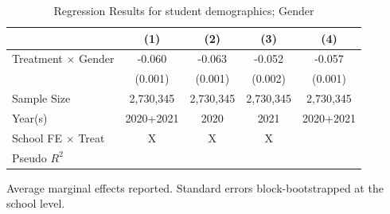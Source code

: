 \begin{table}[!h]
\centering
\caption{Regression Results for student demographics; Gender}
\centering
\begin{threeparttable}
\begin{tabular}[t]{lcccc}
\toprule
 & (1) & (2) & (3) & (4)\\
\midrule
Treatment $\times$ Gender & -0.060 & -0.063 & -0.052 & -0.057\\
 & (0.001) & (0.001) & (0.002) & (0.001)\\
\midrule
Sample Size & 2,730,345 & 2,730,345 & 2,730,345 & 2,730,345\\
Year(s) & 2020+2021 & 2020 & 2021 & 2020+2021\\
School FE × Treat & X & X & X & \\
\addlinespace
Pseudo $R^{2}$ &  &  &  & \\
\bottomrule
\end{tabular}
\begin{tablenotes}
Average marginal effects reported. Standard errors block-bootstrapped at the school level.
\end{tablenotes}
\end{threeparttable}
\label{tab:gender}
\end{table}